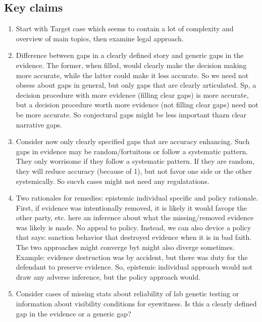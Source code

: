 \documentclass[
  10pt,
  dvipsnames,enabledeprecatedfontcommands]{scrartcl}
\begin{document}
\hypertarget{key-claims}{%
\subsection{Key claims}\label{key-claims}}

\begin{enumerate}
\def\labelenumi{(\arabic{enumi})}
\setcounter{enumi}{-1}
\item
  Start with Target case which seems to contain a lot of complexity and
  overview of main topics, then examine legal approach.
\item
  Difference between gaps in a clearly defined story and generic gaps in
  the evidence. The former, when filled, would clearly make the decision
  making more accurate, while the latter could make it less accurate. So
  we need not obsess about gaps in general, but only gaps that are
  clearly articulated. Sp, a decision procedure with more evidence
  (filling clear gaps) is more accurate, but a decision procedure worth
  more evidence (not filling clear gaps) need not be more accurate. So
  conjectural gaps might be less important thazn clear narrative gaps.
\item
  Consider now only clearly specified gaps that are accuracy enhancing.
  Such gaps in evidence may be random/fortuitous or follow a systematic
  pattern. They only worrisome if they follow a systematic pattern. If
  they are random, they will reduce accuracy (because of 1), but not
  favor one side or the other systemically. So sucvh cases might not
  need any regulatations.
\item
  Two rationales for remedies: epistemic individual specific and policy
  rationale. First, if evidence was intentionally removed, it is likely
  it would favopr the other party, etc. here an inference about what the
  missing/removed evidence was likely is made. No appeal to policy.
  Instead, we can also device a policy that says: sanction behavior that
  destroyed evidence when it is in bad faith. The two approaches might
  converge byt might also diverge sometimes. Example: evidence
  destruction was by accident, but there was duty for the defendant to
  preserve evidence. So, epistemic individual approach would not draw
  any adverse inference, but the policy approach would.
\item
  Consider cases of missing stats about reliability of lab genetic
  testing or information about visibility conditions for eyewitness. Is
  this a clearly defined gap in the evidence or a generic gap?
\end{enumerate}
\end{document}
